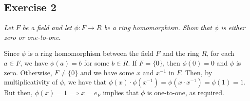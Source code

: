 \subsection*{Exercise 2}
\textit{Let $F$ be a field and let $\phi: F \rightarrow R$ be a ring homomorphism. Show that $\phi$ is either zero or one-to-one.}

\vspace{5 mm}
Since $\phi$ is a ring homomorphism between the field $F$ and the ring $R$, for each $a \in F$, we have $\phi(a) = b$ for some $b \in R$. If $F = \{ 0 \}$, then $\phi(0) = 0$ and $\phi$ is zero. Otherwise, $F \ne \{ 0\}$ and we have some $x$ and $x^{-1}$ in $F$. Then, by multiplicativity of $\phi$, we have that $\phi(x)\cdot\phi(x^{-1}) = \phi(x \cdot x^{-1}) = \phi(1) = 1.$ But then, $\phi(x) = 1 \implies x = e_F$ implies that $\phi$ is one-to-one, as required.